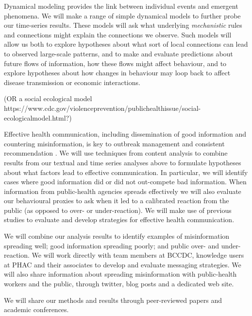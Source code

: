  Dynamical modeling provides the link between individual events and emergent phenomena. 
We will make a range of simple dynamical models to further probe our time-series results.
These models will ask what underlying \emph{mechanistic} rules and connections might explain the connections we observe. 
Such models will allow us both to explore hypotheses about what sort of local connections can lead to observed large-scale patterns, and to make and evaluate predictions about future flows of information, how these flows might affect behaviour, and to explore hypotheses about how changes in behaviour may loop back to affect disease transmission or economic interactions. 


(OR a social ecological model https://www.cdc.gov/violenceprevention/publichealthissue/social-ecologicalmodel.html?) 

Effective health communication, including dissemination of good information and countering misinformation, is key to outbreak management \citep{SongSong17} and consistent recommendation \citep{OhlrSugg18,SongSong17}.
We will use techniques from content analysis \citep{Finf13 ,Mayr14} to combine results from our textual and time series analyses above to formulate hypotheses about what factors lead to effective communication. In particular, we will identify cases where good information did or did not out-compete bad information. When information from public-health agencies spreads effectively we will also evaluate our behavioural proxies to ask when it led to a calibrated reaction from the public (as opposed to over- or under-reaction).
We will make use of previous studies to evaluate \citep{Ding14,FarmSher18,NowaShee15,Tam18} and develop \citep{BekaBigm18, ShenShee15, SongSong17} strategies for effective health communication.


 We will combine our analysis results to identify examples of misinformation spreading well; good information spreading poorly; and public over- and under-reaction. We will work directly with team members at BCCDC, knowledge users at PHAC and their associates to develop and evaluate messaging strategies. We will also share information about spreading misinformation with public-health workers and the public, through twitter, blog posts and a dedicated web site. 

 We will share our methods and results through peer-reviewed papers and academic conferences. 

